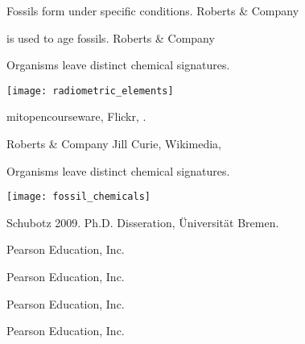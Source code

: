\documentclass[t]{beamer}
\begin{document}
%
{
\begin{frame}[b]{Fossils form under specific conditions.}
\hfill \tiny \textcopyright Roberts \& Company
\end{frame}
}
%
{
\begin{frame}[b]{ is used to age fossils.}
\hfill \tiny \textcopyright Roberts \& Company
\end{frame}
}
%
\begin{frame}[t]{Organisms leave distinct chemical signatures.}

	\texttt{[image: radiometric\_elements]}

	\vfilll
	
	\hfill \tiny mitopencourseware, Flickr, .

\end{frame}
%
{
\begin{frame}[b]
\tiny \textcopyright Roberts \& Company \hfill Jill Curie, Wikimedia,  
\end{frame}
}
%
\begin{frame}[t]{Organisms leave distinct chemical signatures.}

	\texttt{[image: fossil\_chemicals]}

	\vfilll
	
	\hfill \tiny Schubotz 2009. Ph.D. Disseration, Üniversität Bremen.

\end{frame}
%
{
\begin{frame}[b]
\hfill \tiny \textcopyright Pearson Education, Inc.
\end{frame}
}
%
{
\begin{frame}[b]
\hfill \tiny \textcopyright Pearson Education, Inc.
\end{frame}
}
%
{
\begin{frame}[b]
\hfill \tiny \textcopyright Pearson Education, Inc.
\end{frame}
}
%
{
\begin{frame}[b]
\hfill \tiny \textcopyright Pearson Education, Inc.
\end{frame}
}
\end{document}
